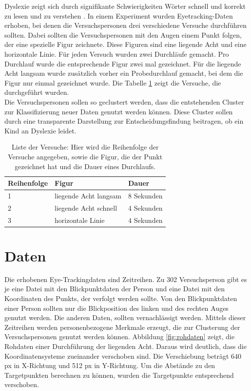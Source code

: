 \documentclass[12pt]{article}
\begin{document}
Dyslexie zeigt sich durch signiﬁkante Schwierigkeiten W\"orter schnell und korrekt zu lesen und zu verstehen \cite{Handlere818, Siegel2006}.
In einem Experiment wurden Eyetracking-Daten erhoben, bei denen die Versuchspersonen drei verschiedene Versuche durchf\"uhren sollten. Dabei sollten die Versuchspersonen mit den Augen einem Punkt folgen, der eine spezielle Figur zeichnete. Diese Figuren sind eine liegende Acht und eine horizontale Linie. F\"ur jeden Versuch wurden zwei Durchl\"aufe gemacht. Pro Durchlauf wurde die entsprechende Figur zwei mal gezeichnet. F\"ur die liegende Acht langsam wurde zus\"atzlich vorher ein Probedurchlauf gemacht, bei dem die Figur nur einmal gezeichnet wurde.
Die Tabelle \ref{tab:Versuche} zeigt die Versuche, die durchgef\"uhrt wurden.\\
Die Versuchspersonen sollen so geclustert werden, dass die entstehenden Cluster zur Klassiﬁzierung neuer Daten genutzt werden k\"onnen. Diese Cluster sollen durch eine transparente Darstellung zur Entscheidungsfindung beitragen, ob ein Kind an Dyslexie leidet.

\begin{table}[h]
	\caption{\label{tab:Versuche}Liste der Versuche: Hier wird die Reihenfolge der Versuche angegeben, sowie die Figur, die der Punkt ge\-zeich\-net hat und die Dauer eines Durchlaufs.}
	\noindent \centering{}
	\bgroup
	\def\arraystretch{2}  %
	\begin{tabular}{|l|l|l|}
		\hline
		\textbf{Reihenfolge} & \textbf{Figur} & \textbf{Dauer}\\
		\hline \hline
		1 & liegende Acht langsam & 8 Sekunden\\
		\hline
		2 & liegende Acht schnell & 4 Sekunden\\
		\hline
		3 & horizontale Linie & 4 Sekunden\\
		\hline
	\end{tabular}
	\egroup
\end{table}

\section*{Daten}
Die erhobenen Eye-Trackingdaten sind Zeitreihen. Zu 302 Versuchsperson gibt es je eine Datei mit den Blickpunktdaten der Person und eine Datei mit den Koordinaten des Punkts, der verfolgt werden sollte. Von den Blickpunktdaten einer Person sollten nur die Blickposition des linken und des rechten Auges genutzt werden. Die anderen Daten, sollten vernachl\"assigt werden.
Mittels dieser Zeitreihen werden personenbezogene Merkmale erzeugt, die zur Clusterung der Versuchspersonen genutzt werden k\"onnen.
Abbildung \ref{fig:rohdaten} zeigt, die Rohdaten einer Durchf\"uhrung der liegenden Acht. Daraus wird deutlich, dass die Koordinatensysteme zueinander verschoben sind. Die Verschiebung betr\"agt 640 px in X-Richtung und 512 px in Y-Richtung. Um die Abst\"ande zu den Targetpunkten berechnen zu k\"onnen, wurden die Targetpunkte entsprechend verschoben.
\end{document}
